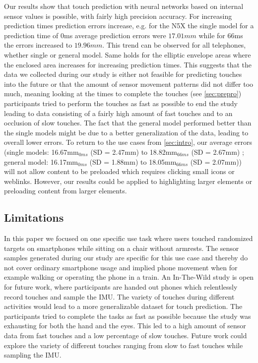 Our results show that touch prediction with neural networks based on internal sensor values is possible, with fairly high precision accuracy.
For increasing prediction times prediction errors increase, e.g. for the N5X the single model for a prediction time of 0ms average prediction errors were $ 17.01mm $ while for 66ms the errors increased to $ 19.96mm $.
This trend can be observed for all telephones, whether single or general model.
Same holds for the elliptic envelope areas where the enclosed area increases for increasing prediction times.
This suggests that the data we collected during our study is either not feasible for predicting touches into the future or that the amount of sensor movement patterns did not differ too much, meaning looking at the times to complete the touches (see \cref{sec:prepro}) participants tried to perform the touches as fast as possible to end the study leading to data consisting of a fairly high amount of fast touches and to an occlusion of slow touches. 
The fact that the general model performed better than the single models might be due to a better generalization of the data, leading to overall lower errors.
To return to the use cases from \cref{sec:intro}, our average errors (single models: 16.67mm$_{0ms}$ (SD = 2.47mm) to 18.82mm$_{66ms}$ (SD = 2.67mm) ; general model: 16.17mm$_{0ms}$ (SD = 1.88mm) to 18.05mm$_{66ms}$ (SD = 2.07mm)) will not allow content to be preloaded which requires clicking small icons or weblinks. 
However, our results could be applied to highlighting larger elements or preloading content from larger elements.

\subsection*{Limitations}
In this paper we focused on one specific use task where users touched randomized targets on smartphones while sitting on a chair without armrests. 
The sensor samples generated during our study are specific for this use case and thereby do not cover ordinary smartphone usage and implied phone movement when for example walking or operating the phone in a train.
An In-The-Wild study is open for future work, where participants are handed out phones which relentlessly record touches and sample the IMU.
The variety of touches during different activities would lead to a more generalizable dataset for touch prediction.
The participants tried to complete the tasks as fast as possible because the study was exhausting for both the hand and the eyes.
This led to a high amount of sensor data from fast touches and a low percentage of slow touches.
Future work could explore the variety of different touches ranging from slow to fast touches  while sampling the IMU.

